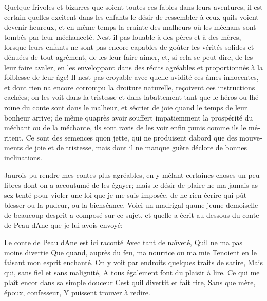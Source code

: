 \documentclass[14pt,a4paper]{memoir}
\begin{document}
\begin{otherlanguage}{french}
Quelque frivoles et bizarres que soient toutes ces fables dans leurs
aventures, il est certain qu\textquotesingle elles excitent dans les
enfants le désir de ressembler à ceux qu\textquotesingle ils voient
devenir heureux, et en même temps la crainte des malheurs où les méchans
sont tombés par leur méchanceté. N\textquotesingle est-il pas louable à
des pères et à des mères, lorsque leurs enfants ne sont pas encore
capables de goûter les vérités solides et dénuées de tout agrément, de
les leur faire aimer, et, si cela se peut dire, de les leur faire
avaler, en les enveloppant dans des récits agréables et proportionnés à
la foiblesse de leur âge! Il n\textquotesingle est pas croyable avec
quelle avidité ces âmes innocentes, et dont rien n\textquotesingle a
encore corrompu la droiture naturelle, reçoivent ces instructions
cachées; on les voit dans la tristesse et dans
l\textquotesingle abattement tant que le héros ou
l\textquotesingle héroïne du conte sont dans le malheur, et
s\textquotesingle écrier de joie quand le temps de leur bonheur arrive;
de même qu\textquotesingle après avoir souffert impatiemment la
prospérité du méchant ou de la méchante, ils sont ravis de les voir
enfin punis comme ils le méritent. Ce sont des semences
qu\textquotesingle on jette, qui ne produisent d\textquotesingle abord
que des mouvements de joie et de tristesse, mais dont il ne manque guère
d\textquotesingle éclore de bonnes inclinations.

J\textquotesingle aurois pu rendre mes contes plus agréables, en y
mêlant certaines choses un peu libres dont on a accoutumé de les égayer;
mais le désir de plaire ne m\textquotesingle a jamais assez tenté pour
violer une loi que je me suis imposée, de ne rien écrire qui pût blesser
ou la pudeur, ou la bienséance. Voici un madrigal qu\textquotesingle une
jeune demoiselle de beaucoup d\textquotesingle esprit a composé sur ce
sujet, et qu\textquotesingle elle a écrit au-dessous du conte de Peau
d\textquotesingle Ane que je lui avois envoyé:

{Le conte de Peau d\textquotesingle Ane est ici raconté} {Avec tant de
naïveté,} {Qu\textquotesingle il ne m\textquotesingle a pas moins
divertie} {Que quand, auprès du feu, ma nourrice ou ma mie } {Tenoient
en le faisant mon esprit enchanté.} {On y voit par endroits quelques
traits de satire, } {Mais qui, sans fiel et sans malignité,} {A tous
également font du plaisir à lire.} {Ce qui me plaît encor dans sa simple
douceur} {C\textquotesingle est qu\textquotesingle il divertit et fait
rire,} {Sans que mère, époux, confesseur,} {Y puissent trouver à
redire.}


\end{otherlanguage}
\end{document}
